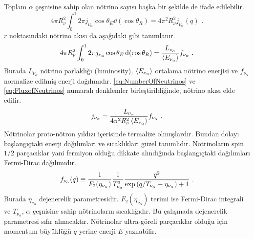Toplam $ \alpha $ çeşnisine sahip olan nötrino sayısı başka bir şekilde de ifade edilebilir.
\begin{equation}\label{eq:NumberOfNeutrinos}
    4\pi R^{2}_{\nu}\int^{1}_{0}2\pi j_{\nu_{\alpha}} \cos \theta_{E} \dd (\cos \theta_{R}) = 4\pi^{2}R_{\nu}^{2}j_{\nu_{\alpha}}(q) \text{ .}
\end{equation}
$ r $ noktasındaki nötrino akısı da aşağıdaki gibi tanımlanır.
\begin{align}\label{eq:FluxofNeutrinos}
    4\pi R^{2}_{\nu}\int^{1}_{0}2\pi j_{\nu_{\alpha}} \cos \theta_{E} \dd (\cos \theta_{R}) = \dfrac{L_{\nu_{\alpha}}}{\expval{E_{\nu_{\alpha}}}} f_{\nu_{\alpha}} \text{ .}
\end{align}
Burada $ L_{\nu_{\alpha}} $ nötrino parlaklığı (luminosity), $ \expval{E_{\nu_{\alpha}}} $ ortalama nötrino enerjisi ve $f_{\nu_{\alpha}}  $ normalize edilmiş enerji dağılımıdır. \eqref{eq:NumberOfNeutrinos} ve \eqref{eq:FluxofNeutrinos} numaralı denklemler birleştirildiğinde, nötrino akısı elde edilir.
\begin{equation}
    j_{\nu_{\alpha}}=\dfrac{L_{\nu_{\alpha}}}{4\pi^{2}R^{2}_{\nu} \expval{E_{\nu_{\alpha}}}}f_{\nu_{\alpha}} \text{ .}
\end{equation}
Nötrinolar proto-nötron yıldızı içerisinde termalize olmuşlardır. Bundan dolayı başlangıçtaki enerji dağılımları ve sıcaklıkları güzel tanımlıdır. Nötrinoların spin $ 1/2 $ parçacıklar yani fermiyon olduğu dikkate alındığında başlangıçtaki dağılımları Fermi-Dirac dağılımıdır.
\begin{align}
	f_{\nu_{\alpha}}(q) \equiv \dfrac{1}{F_{2}(\eta_{\nu_{\alpha}})}\dfrac{1}{T^{3}_{\nu_{\alpha}}}\dfrac{q^{2}}{\exp \qty(q/T_{\nu_{\alpha}} - \eta_{\nu_{\alpha}})+1} \text{ .}
\end{align}
Burada $ \eta_{\nu_{\alpha}} $ dejenerelik parametresidir. $ F_{2}(\eta_{\nu_{\alpha}}) $ terimi ise Fermi-Dirac integrali ve $ T_{\nu_{\alpha}} $, $ \alpha $ çeşnisine sahip nötrinoların sıcaklığıdır. Bu çalışmada dejenerelik parametresi sıfır alınacaktır. Nötrinolar ultra-göreli parçacıklar olduğu için momentum büyüklüğü $ q $ yerine enerji $ E $ yazılabilir.

